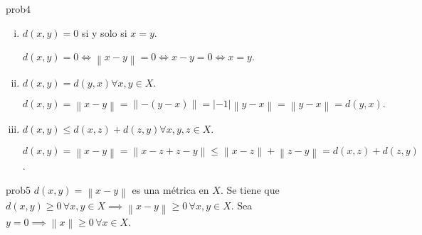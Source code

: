 \begin{sol}{prob4}
    \leavevmode
    \begin{enumerate}[i)]
        \item $d\left(x,y\right)=0$ si y solo si $x=y$.


              \begin{math}
                  d\left(x,y\right)=
                  0\iff
                  \left\|x-y\right\|=
                  0\iff
                  x-y=
                  0\iff
                  x=
                  y
              \end{math}.

        \item

              \begin{math}
                  d\left(x,y\right)=
                  d\left(y,x\right)\forall
                  x,y\in X
              \end{math}.

              \begin{math}
                  d\left(x,y\right)=
                  \left\|x-y\right\|=
                  \left\|-\left(y-x\right)\right\|=
                  \left|-1\right|\left\|y-x\right\|=
                  \left\|y-x\right\|=
                  d\left(y,x\right).
              \end{math}


        \item

              \begin{math}
                  d\left(x,y\right)\leq
                  d\left(x,z\right)+d\left(z,y\right)\forall
                  x,y,z\in X
              \end{math}.

              \begin{math}
                  d\left(x,y\right)=
                  \left\|x-y\right\|=
                  \left\|x-z+z-y\right\|\leq
                  \left\|x-z\right\|+\left\|z-y\right\|=
                  d\left(x,z\right)+d\left(z,y\right)
              \end{math}.
    \end{enumerate}
\end{sol}

\begin{sol}{prob5}
    \begin{math}
        d\left(x,y\right)=
        \left\|x-y\right\|
    \end{math}
    es una métrica
    en $X$.
    Se tiene que
    \begin{math}
        d\left(x,y\right)\geq
        0\,\forall
        x,y\in X\implies
        \left\|x-y\right\|\geq
        0\,\forall x,y\in X
    \end{math}.
    Sea
    \begin{math}
        y=
        0\implies
        \left\|x\right\|\geq
        0\,\forall
        x\in X
    \end{math}.
\end{sol}

